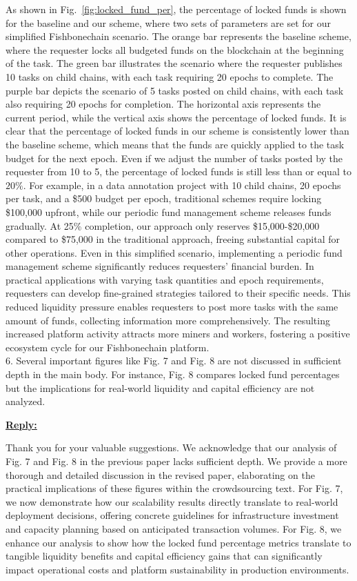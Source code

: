 {{As shown in Fig.~\ref{fig:locked_fund_per}, the percentage of locked funds is shown for the baseline and our scheme, where two sets of parameters are set for our simplified Fishbonechain scenario. The orange bar represents the baseline scheme, where the requester locks all budgeted funds on the blockchain at the beginning of the task. The green bar illustrates the scenario where the requester publishes 10 tasks on child chains, with each task requiring 20 epochs to complete. The purple bar depicts the scenario of 5 tasks posted on child chains, with each task also requiring 20 epochs for completion. The horizontal axis represents the current period, while the vertical axis shows the percentage of locked funds. It is clear that the percentage of locked funds in our scheme is consistently lower than the baseline scheme, which means that the funds are quickly applied to the task budget for the next epoch. Even if we adjust the number of tasks posted by the requester from 10 to 5, the percentage of locked funds is still less than or equal to $20 \%$. For example, in a data annotation project with 10 child chains, 20 epochs per task, and a \$500 budget per epoch, traditional schemes require locking \$100,000 upfront, while our periodic fund management scheme releases funds gradually. At 25\% completion, our approach only reserves \$15,000-\$20,000 compared to \$75,000 in the traditional approach, freeing substantial capital for other operations. Even in this simplified scenario, implementing a periodic fund management scheme significantly reduces requesters' financial burden. In practical applications with varying task quantities and epoch requirements, requesters can develop fine-grained strategies tailored to their specific needs. This reduced liquidity pressure enables requesters to post more tasks with the same amount of funds, collecting information more comprehensively. The resulting increased platform activity attracts more miners and workers, fostering a positive ecosystem cycle for our Fishbonechain platform.
}\\ %

6. Several important figures like Fig. 7 and Fig. 8 are not discussed in sufficient depth in the main body. For instance, Fig. 8 compares locked fund percentages but the implications for real-world liquidity and capital efficiency are not analyzed.

{\color{blue}
\noindent \underline{\textbf{Reply:}}

Thank you for your valuable suggestions. We acknowledge that our analysis of Fig. 7 and Fig. 8 in the previous paper lacks sufficient depth. We provide a more thorough and detailed discussion in the revised paper, elaborating on the practical implications of these figures within the crowdsourcing text.
For Fig. 7, we now demonstrate how our scalability results directly translate to real-world deployment decisions, offering concrete guidelines for infrastructure investment and capacity planning based on anticipated transaction volumes. For Fig. 8, we enhance our analysis to show how the locked fund percentage metrics translate to tangible liquidity benefits and capital efficiency gains that can significantly impact operational costs and platform sustainability in production environments.

}}
